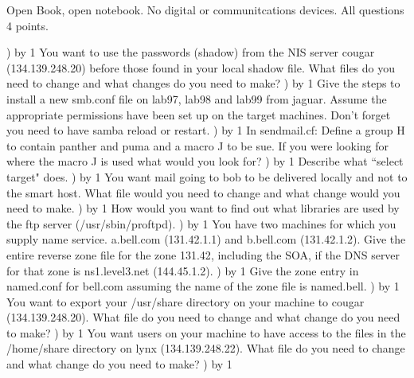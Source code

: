 
\parindent=0in
\nopagenumbers
\newcount\quesno
{}
\def\ques{\number\quesno) \advance\quesno by 1}
\def\aspace{\vskip 1.5in}

Open Book, open notebook. No digital or communitcations devices.
All questions 4 points.

\ques
You want to use the passwords ({\ltt{}shadow}) from the NIS server
{\ltt{}cougar} ({\ltt{}134.139.248.20})
before those found in your local shadow file.
What files do you need to change and what changes do you need to make?
\vskip 1.7in
\ques
Give the steps to install a new {\ltt{}smb.conf} file on 
{\ltt{}lab97}, {\ltt{}lab98} and {\ltt{}lab99} from {\ltt{}jaguar}.
Assume the appropriate permissions have been set up on the
target machines.
Don't forget you need to have samba reload or restart.
\vskip 2.4in
\ques
In {\ltt{}sendmail.cf}:
Define a group {\ltt{}H} to contain {\ltt{}panther} and {\ltt{}puma}
and a macro {\ltt{}J} to be {\ltt{}sue}.
If you were looking for where the macro J is used what would you look for?
\vskip 1.6in
\ques
Describe what ``select target" does.
\vskip 1.5in
\vfill\eject
\ques
You want mail going to {\ltt{}bob} to be delivered locally
and not to the smart host.
What file would you need to change and what change would you need to make.
\vskip 1.0in
\ques
How would you want to find out what libraries are used by the ftp server
({\ltt{}/usr/sbin/proftpd}).
\vskip 0.7in
\ques
You have two machines for which you supply name service.
{\ltt{}a.bell.com} ({\ltt{}131.42.1.1}) and 
{\ltt{}b.bell.com} ({\ltt{}131.42.1.2}).
Give the entire reverse zone file for the zone {\ltt{}131.42},
including the SOA, if the DNS server for that zone
is {\ltt{}ns1.level3.net} ({\ltt{}144.45.1.2}).
\vskip 4.2in
\ques
Give the zone entry in {\ltt{}named.conf}
for {\ltt{}bell.com}  assuming
the name of the zone file is {\ltt{}named.bell}.
\vfill\eject
\ques
You want to export your
{\ltt{}/usr/share} directory on your machine to {\ltt{}cougar}
({\ltt{}134.139.248.20}).
What file do you need to change and what change do you need to make?
\vskip 0.8in
\ques
You want users on your machine to have access to the files in the
{\ltt{}/home/share} directory on {\ltt{}lynx} ({\ltt{}134.139.248.22}).
What file do you need to change and what change do you need to make?
\vskip 0.9in
\ques
